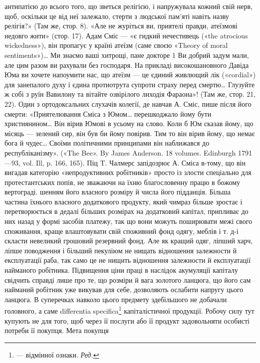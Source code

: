 антипатією до всього того, що зветься релігією, і напружувала
кожний свій нерв, щоб, оскільки це від неї залежало, стерти з людської
пам’яті навіть назву релігія?» (Там же, стор. 8). «Але не журіться ви,
приятелі правди, атеїзмові недовго жити» (стор. 17). Адам Сміс — «є
гидкий нечестивець («the atrocious wickedness»), він пропагує у країні
атеїзм (саме своєю «Theory of moral sentiments»)\dots{} Ми знаємо ваші хитрощі,
пане докторе 1 Ви добрий задум мали, але цим разом ви рахували без господаря.
На прикладі високошановного Давіда Юма ви хочете напоумити
нас, що атеїзм — це єдиний живлющий лік («cordial») для занепалого
духу і єдина протиотрута супроти страху перед смертю\dots{} Глузуйте ж
собі з руїн Вавилону та вітайте озвірілого лиходія Фараона»! (Там же,
стор. 21, 22). Один з ортодоксальних слухачів колегії, де навчав А. Сміс,
пише після його смерти: «Приятелювання Сміса з Юмом\dots{} перешкоджало
йому бути християнином\dots{} Він вірив Юмові в усьому на слово.
Коли б Юм сказав йому, що місяць — зелений сир, він був би йому повірив.
Тим то він вірив йому, що немає бога й чудес\dots{} Своїми політичними
принципами він наближався до республіканізму». («The Bee». By James
Anderson. 18 volumes. Edinburgh 1791—93, vol. Ill, p. 166, 165). Піц
T. Чалмерс запідозрює А. Сміса в-тому, що він вигадав категорію «непродуктивних
робітників» просто із злости спеціально для протестантських
попів, не зважаючи на їхню благословенну працю в божому вертограді.
шенням його власного розміру й числа його підданців. Більша
частина їхнього власного додаткового продукту, який чимраз
більше зростає і перетворюється в дедалі більших розмірах на
додатковий капітал, припливає до них назад у формі засобів
платежу, так що вони можуть поширювати межі свого споживання,
краще влаштовувати свій споживний фонд одягу, меблів
і т. д-і скласти невеликий грошовий резервний фонд. Але як
кращий одяг, ліпший харч, ліпше поводження і більший пекуліюм
не нищать відношення залежности й експлуатації раба,
так само це не нищить відношення залежности й експлуатації
найманого робітника. Підвищення ціни праці в наслідок акумуляції
капіталу свідчить справді лише про те, що розміри й вага
золотого ланцюга, що його сам найманий робітник уже викував
для себе, дозволяють ослабити напругу цього ланцюга. В суперечках
навколо цього предмету здебільшого не добачали головного,
а саме differentia specifica\footnote*{
— відмінної ознаки. \emph{Ред.}
} капіталістичної продукції.
Робочу силу тут купують не для того, щоб через її послуги або
її продукт задовольняти особисті потреби її покупця. Мета покупця
